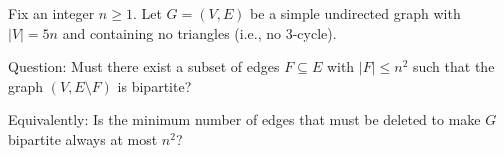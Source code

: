 Fix an integer $n\ge 1$. Let $G=(V,E)$ be a simple undirected graph with $|V|=5n$ and containing no triangles (i.e., no $3$-cycle).

Question: Must there exist a subset of edges $F\subseteq E$ with $|F|\le n^2$ such that the graph $(V, E\setminus F)$ is bipartite?

Equivalently: Is the minimum number of edges that must be deleted to make $G$ bipartite always at most $n^2$?
